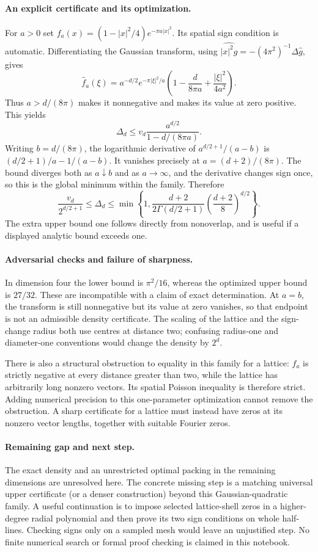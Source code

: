 \documentclass[11pt,a4paper]{article}
\begin{document}
\paragraph{An explicit certificate and its optimization.}
For $a>0$ set $f_a(x)=(1-|x|^2/4)e^{-\pi a|x|^2}$. Its spatial sign condition is automatic. Differentiating the Gaussian transform, using
$\widehat{|x|^2g}=-(4\pi^2)^{-1}\Delta\widehat g$, gives
\[
\widehat f_a(\xi)=a^{-d/2}e^{-\pi|\xi|^2/a}
 \left(1-\frac{d}{8\pi a}+\frac{|\xi|^2}{4a^2}\right).
\]
Thus $a>d/(8\pi)$ makes it nonnegative and makes its value at zero positive. This yields
\[
\Delta_d\le v_d\frac{a^{d/2}}{1-d/(8\pi a)}.
\]
Writing $b=d/(8\pi)$, the logarithmic derivative of $a^{d/2+1}/(a-b)$ is $(d/2+1)/a-1/(a-b)$. It vanishes precisely at $a=(d+2)/(8\pi)$. The bound diverges both as $a\downarrow b$ and as $a\to\infty$, and the derivative changes sign once, so this is the global minimum within the family. Therefore
\[
\frac{v_d}{2^{d/2+1}}\le\Delta_d
 \le\min\left\{1,\frac{d+2}{2\Gamma(d/2+1)}
             \left(\frac{d+2}{8}\right)^{d/2}\right\}.
\]
The extra upper bound one follows directly from nonoverlap, and is useful if a displayed analytic bound exceeds one.

\paragraph{Adversarial checks and failure of sharpness.}
In dimension four the lower bound is $\pi^2/16$, whereas the optimized upper bound is $27/32$. These are incompatible with a claim of exact determination. At $a=b$, the transform is still nonnegative but its value at zero vanishes, so that endpoint is not an admissible density certificate. The scaling of the lattice and the sign-change radius both use centres at distance two; confusing radius-one and diameter-one conventions would change the density by $2^d$.

There is also a structural obstruction to equality in this family for a lattice: $f_a$ is strictly negative at every distance greater than two, while the lattice has arbitrarily long nonzero vectors. Its spatial Poisson inequality is therefore strict. Adding numerical precision to this one-parameter optimization cannot remove the obstruction. A sharp certificate for a lattice must instead have zeros at its nonzero vector lengths, together with suitable Fourier zeros.

\paragraph{Remaining gap and next step.}
The exact density and an unrestricted optimal packing in the remaining dimensions are unresolved here. The concrete missing step is a matching universal upper certificate (or a denser construction) beyond this Gaussian-quadratic family. A useful continuation is to impose selected lattice-shell zeros in a higher-degree radial polynomial and then prove its two sign conditions on whole half-lines. Checking signs only on a sampled mesh would leave an unjustified step. No finite numerical search or formal proof checking is claimed in this notebook.
\end{document}
